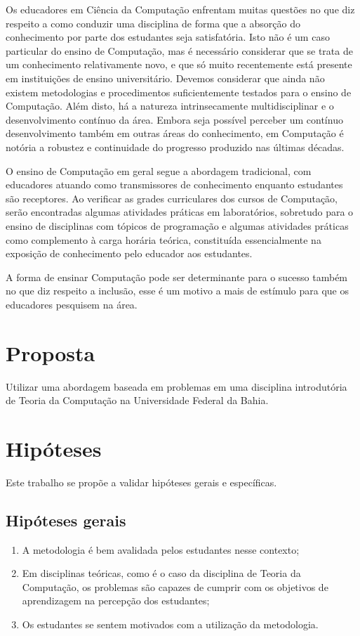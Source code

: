 \acresetall
Os educadores em Ciência da Computação enfrentam muitas questões no que diz
respeito a como conduzir uma disciplina de forma que a absorção do conhecimento
por parte dos estudantes seja satisfatória.
Isto não é um caso particular do ensino de Computação,
mas é necessário considerar que se trata de
um conhecimento relativamente novo, e que só muito
recentemente está presente em instituições de ensino universitário.
Devemos considerar que ainda não existem metodologias e procedimentos
suficientemente testados para o ensino de Computação.
Além disto, há a natureza intrinsecamente multidisciplinar e
o desenvolvimento contínuo da área.
Embora seja possível perceber um contínuo desenvolvimento também em
outras áreas do conhecimento, em Computação é notória a robustez e
continuidade do progresso produzido nas últimas décadas.

O ensino de Computação em geral segue a abordagem tradicional,
com educadores atuando como transmissores de conhecimento
enquanto estudantes são receptores.
Ao verificar as grades curriculares dos cursos de Computação,
serão encontradas algumas atividades práticas em laboratórios,
sobretudo para o ensino de disciplinas com tópicos de programação e
algumas atividades práticas como complemento à carga horária teórica,
constituída essencialmente na exposição de conhecimento pelo educador
aos estudantes.

A forma de ensinar Computação pode ser determinante
para o sucesso também no que diz respeito a
inclusão, esse é um motivo a mais de estímulo para
que os educadores pesquisem na área.

\section{Proposta}
Utilizar uma abordagem baseada em problemas em uma disciplina
introdutória de Teoria da Computação na Universidade Federal da Bahia.

\section{Hipóteses}
Este trabalho se propõe a validar hipóteses gerais e específicas.

\subsection{Hipóteses gerais}
\begin{enumerate}
\item{A metodologia é bem avalidada pelos estudantes nesse contexto;}
\item{Em disciplinas teóricas, como é o caso da disciplina de Teoria da Computação, os problemas
são capazes de cumprir com os objetivos de aprendizagem na percepção dos estudantes;}
\item{Os estudantes se sentem motivados com a utilização da metodologia.}
\end{enumerate}

